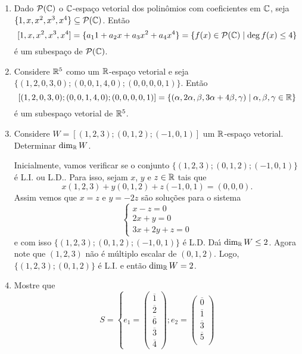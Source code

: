 \begin{exemplo}
	\begin{enumerate}
		\item Dado $\mathcal{P}(\mathbb{C})$ o $\mathbb{C}$-espa\c{c}o vetorial dos polin\^omios com coeficientes em $\mathbb{C}$, seja $\{1,x,x^2,x^3,x^4\} \subseteq \mathcal{P}(\mathbb{C})$. Ent\~ao
		\[
			[1,x,x^2,x^3,x^4] = \{a_11 + a_2x + a_3x^2 + a_4x^4\} = \{f(x) \in \mathcal{P}(\mathbb{C}) \mid \deg f(x) \le 4\}
		\]
		\'e um subespa\c{c}o de $\mathcal{P}(\mathbb{C})$.
		\item Considere $\mathbb{R}^5$ como um $\mathbb{R}$-espa\c{c}o vetorial e seja $\{(1,2,0,3,0);(0,0,1,4,0);(0,0,0,0,1)\}$. Ent\~ao
		\[
			[(1,2,0,3,0);(0,0,1,4,0);(0,0,0,0,1)] = \{(\alpha, 2\alpha,\beta,3\alpha + 4\beta,\gamma) \mid \alpha, \beta, \gamma \in \mathbb{R}\}
		\]
		\'e um subespa\c{c}o vetorial de $\mathbb{R}^5$.
		\item Considere $W = [(1,2,3);(0,1,2);(-1,0,1)]$ um $\mathbb{R}$-espa\c{c}o vetorial. Determinar $\dim_{\mathbb{R}} W$.
		\begin{solucao}
			Inicialmente, vamos verificar se o conjunto $\{(1,2,3);(0,1,2);(-1,0,1)\}$ \'e L.I. ou L.D.. Para isso, sejam $x$, $y$ e $z \in \mathbb{R}$ tais que
			\[
				x(1,2,3) + y(0,1,2) + z(-1,0,1) = (0,0,0).
			\]
			Assim vemos que $x = z$ e $y = -2z$ s\~ao solu\c{c}\~oes para o sistema
			\[
				\begin{cases}
					x - z = 0\\
					2x + y = 0\\
					3x + 2y + z = 0
				\end{cases}
			\]
			e com isso $\{(1,2,3);(0,1,2);(-1,0,1)\}$ \'e L.D. Da{\'\i} $\dim_{\mathbb{R}} W \le 2$. Agora note que $(1,2,3)$ n\~ao \'e m\'ultiplo escalar de $(0,1,2)$. Logo, $\{(1,2,3); (0,1,2)\}$ \'e L.I. e ent\~ao $\dim_{\mathbb{R}} W = 2$.
		\end{solucao}
		\item Mostre que
		\[
			S = \left\{ e_1 = \begin{pmatrix}
				\overline{1}\\
				\overline{2}\\
				\overline{6}\\
				\overline{3}\\
				\overline{4}
			\end{pmatrix}; e_2 = \begin{pmatrix}
				\overline{0}\\
				\overline{1}\\
				\overline{3}\\
				\overline{5}\\

\end{pmatrix}\]
\end{enumerate}
\end{exemplo}
